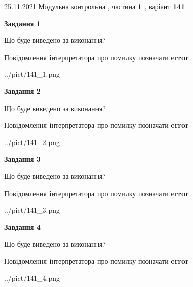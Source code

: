 \documentclass[10pt, ukrainian]{article}
\begin{document}
{25.11.2021 Модульна контрольна , частина \textbf { 1 }, варіант  \No \textbf { 141 }\par}
{
\begin {large}

{\begin {center}\textbf{Завдання 1}\end {center}}\par
Що буде виведено за виконання? \par
Повідомлення інтерпретатора про помилку позначати \textbf{error}

\begin{center}
	{../pict/141_1.png}
\end{center}
\newpage

{\begin {center}\textbf{Завдання 2}\end {center}}\par
Що буде виведено за виконання? \par
Повідомлення інтерпретатора про помилку позначати \textbf{error}

\begin{center}
	{../pict/141_2.png}
\end{center}
\newpage

{\begin {center}\textbf{Завдання 3}\end {center}}\par
Що буде виведено за виконання? \par
Повідомлення інтерпретатора про помилку позначати \textbf{error}

\begin{center}
	{../pict/141_3.png}
\end{center}
\newpage

{\begin {center}\textbf{Завдання 4}\end {center}}\par
Що буде виведено за виконання? \par
Повідомлення інтерпретатора про помилку позначати \textbf{error}

\begin{center}
	{../pict/141_4.png}
\end{center}
\newpage


\end{large}}
\end{document}
